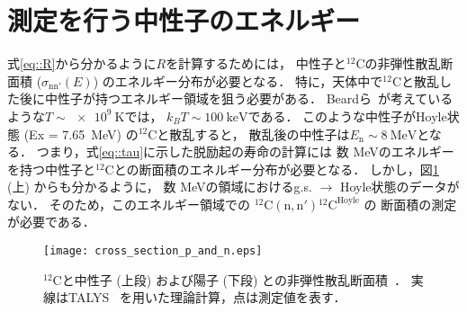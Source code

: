 \documentclass[../master]{subfiles}
\begin{document}
\section{測定を行う中性子のエネルギー}
式\eqref{eq::R}から分かるように$R$を計算するためには，
中性子と${}^{12}\mathrm{C}$の非弾性散乱断面積 ($\sigma_\mathrm{nn'} (E)$) のエネルギー分布が必要となる．
特に，天体中で${}^{12}\mathrm{C}$と散乱した後に中性子が持つエネルギー領域を狙う必要がある．
Beardら~\cite{hotdensemedium}が考えているような$T\sim\SI{e9}{\kelvin}$では，
$k_{B}T\sim\SI{100}{\kilo\electronvolt}$である．%
このような中性子がHoyle状態 (Ex = \SI{7.65}{\mega\electronvolt}) の${}^{12}\mathrm{C}$と散乱すると，
散乱後の中性子は$E_{\text{n}}\sim\SI{8}{\mega\electronvolt}$となる．
つまり，式\eqref{eq::tau}に示した脱励起の寿命の計算には
数 \si{\mega\electronvolt}のエネルギーを持つ中性子と${}^{12}\mathrm{C}$との断面積のエネルギー分布が必要となる．
しかし，図\ref{fig::crosssection_pres} (上) からも分かるように，
数 \si{\mega\electronvolt}の領域におけるg.s. $\rightarrow$ Hoyle状態のデータがない．
そのため，このエネルギー領域での ${}^{12}\mathrm{C}(\mathrm{n},\mathrm{n}'){}^{12}\mathrm{C}^{{\text{Hoyle}}}$ の
断面積の測定が必要である．
\begin{figure}
  \centering
  \texttt{[image: cross\_section\_p\_and\_n.eps]}
  \caption[${}^{12}\mathrm{C}$と中性子 (上段) および陽子 (下段) との非弾性散乱断面積．]
          {${}^{12}\mathrm{C}$と中性子 (上段) および陽子 (下段) との非弾性散乱断面積~\cite{hotdensemedium}．
  実線はTALYS~\cite{talys-1.0} を用いた理論計算，点は測定値を表す．}
  \label{fig::crosssection_pres}
\end{figure}%
\end{document}
